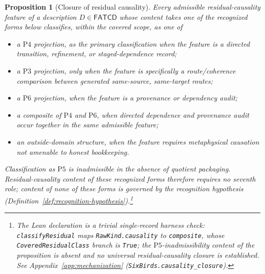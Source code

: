 \documentclass[11pt]{article}
\newtheorem{proposition}[theorem]{Proposition}
\theoremstyle{definition}
\newcommand{\FATCD}{\ensuremath{\mathsf{FATCD}}}
\newcommand{\Pthree}{\ensuremath{\mathrm{P3}}}
\newcommand{\Pfour}{\ensuremath{\mathrm{P4}}}
\newcommand{\Pfive}{\ensuremath{\mathrm{P5}}}
\newcommand{\Psix}{\ensuremath{\mathrm{P6}}}
\begin{document}
\begin{proposition}[Closure of residual causality]\label{prop:causality-closure}
Every admissible residual-causality feature of a description
\(D \in \FATCD{}\) whose content takes one of the recognized forms below
classifies, within the covered scope, as one of
\begin{itemize}[topsep=2pt,itemsep=1pt]
  \item a \Pfour{} projection, as the primary classification when the
    feature is a directed transition, refinement, or staged-dependence
    record;
  \item a \Pthree{} projection, only when the feature is specifically a
    route/coherence comparison between generated same-source,
    same-target routes;
  \item a \Psix{} projection, when the feature is a provenance or
    dependency audit;
  \item a composite of \Pfour{} and \Psix{}, when directed dependence
    and provenance audit occur together in the same admissible feature;
  \item an outside-domain structure, when the feature requires
    metaphysical causation not amenable to honest bookkeeping.
\end{itemize}
Classification as \Pfive{} is inadmissible in the absence of quotient
packaging. Residual-causality content of these recognized forms therefore requires no
seventh role; content of none of these forms is governed by the recognition
hypothesis (Definition~\ref{def:recognition-hypothesis}).\footnote{The Lean declaration is a trivial single-record harness check: \texttt{classifyResidual} maps \texttt{RawKind.causality} to \texttt{composite}, whose \texttt{CoveredResidualClass} branch is \texttt{True}; the \Pfive{}-inadmissibility content of the proposition is absent and no universal residual-causality closure is established. See Appendix~\ref{app:mechanization} (\texttt{SixBirds.causality\_closure}).}
\end{proposition}
\end{document}
